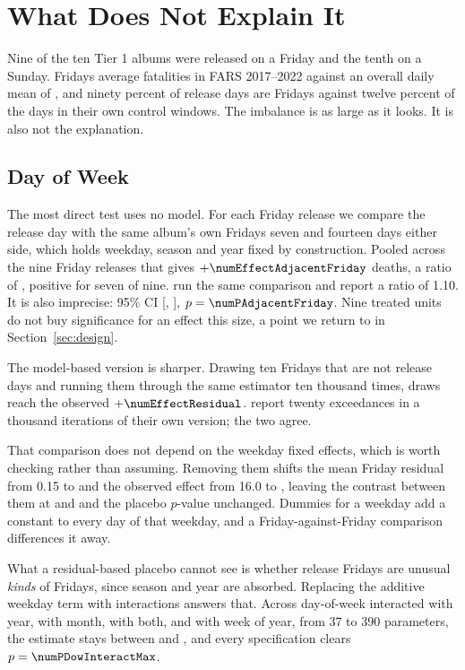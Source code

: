 \documentclass[11pt]{article}
\begin{document}
\section{What Does Not Explain It}
\label{sec:empirical_issues}

Nine of the ten Tier 1 albums were released on a Friday and the tenth on a Sunday. Fridays average
\numFridayMean{} fatalities in FARS 2017--2022 against an overall daily mean of \numOverallMean{},
and ninety percent of release days are Fridays against twelve percent of the days in their own
control windows. The imbalance is as large as it looks. It is also not the explanation.

\subsection{Day of Week}

The most direct test uses no model. For each Friday release we compare the release day with the
same album's own Fridays seven and fourteen days either side, which holds weekday, season and year
fixed by construction. Pooled across the nine Friday releases that gives
$+\numEffectAdjacentFriday$ deaths, a ratio of \numRatioAdjacentFriday{}, positive for seven of
nine. \citet{patel2026smartphones} run the same comparison and report a ratio of 1.10. It is also
imprecise: 95\% CI [\numCIAdjacentFridayLo, \numCIAdjacentFridayHi], $p = \numPAdjacentFriday$.
Nine treated units do not buy significance for an effect this size, a point we return to in
Section~\ref{sec:design}.

The model-based version is sharper. Drawing ten Fridays that are not release days and running them
through the same estimator ten thousand times, \numFridayPlaceboDraws{} draws reach the observed
$+\numEffectResidual$. \citet{patel2026smartphones} report twenty exceedances in a thousand
iterations of their own version; the two agree.

That comparison does not depend on the weekday fixed effects, which is worth checking rather than
assuming. Removing them shifts the mean Friday residual from 0.15 to \numFridayResidNoDow{} and
the observed effect from 16.0 to \numObservedNoDow{}, leaving the contrast between them at
\numContrastWithDow{} and \numContrastNoDow{} and the placebo $p$-value unchanged. Dummies for a
weekday add a constant to every day of that weekday, and a Friday-against-Friday comparison
differences it away.

What a residual-based placebo cannot see is whether release Fridays are unusual \emph{kinds} of
Fridays, since season and year are absorbed. Replacing the additive weekday term with interactions
answers that. Across day-of-week interacted with year, with month, with both, and with week of
year, from 37 to 390 parameters, the estimate stays between \numEffectDowInteractMin{} and
\numEffectDowInteractMax{}, and every specification clears $p = \numPDowInteractMax$.
\end{document}
